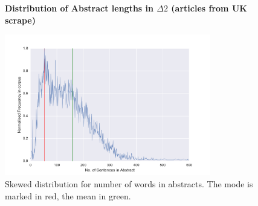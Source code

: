 \begin{figure}[H]
    \centering
    \textbf{Distribution of Abstract lengths in $\Delta2$ (articles from UK scrape)}\par\medskip
    \includegraphics[width=0.8\textwidth]{Appendix/Data_Acquisition/abstracts.png}
    \caption[Distribution of Abstract lengths in $\Delta2$ (Articles from UK)]{Skewed distribution for number of words in abstracts. The mode is marked in red, the mean in green.}
     \label{fig:abstract_sens}
\end{figure}

